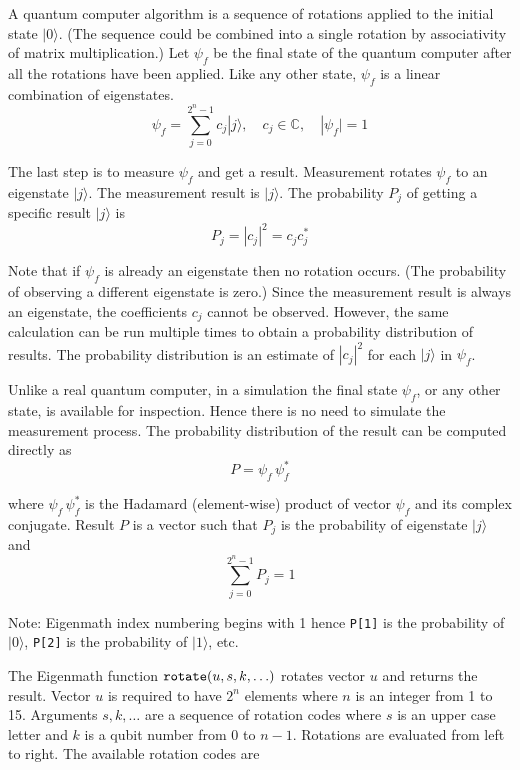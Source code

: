 \documentclass[12pt]{article}
\begin{document}
A quantum computer algorithm is a sequence of rotations
applied to the initial state $|0\rangle$.
(The sequence could be combined into a single rotation
by associativity of matrix multiplication.)
Let $\psi_f$ be the final state of the quantum computer
after all the rotations have been applied.
Like any other state, $\psi_f$ is a linear combination of eigenstates.
\begin{equation*}
\psi_f=\sum_{j=0}^{2^n-1}c_j|j\rangle,
\quad
c_j\in\mathbb C,
\quad
|\psi_f|=1
\end{equation*}

The last step is to measure $\psi_f$ and get a result.
Measurement rotates $\psi_f$ to an eigenstate $|j\rangle$.
The measurement result is $|j\rangle$.
The probability $P_j$ of getting a specific result $|j\rangle$ is
\begin{equation*}
P_j=|c_j|^2=c_jc_j^*
\end{equation*}

Note that if $\psi_f$ is already an eigenstate then no rotation occurs.
(The probability of observing a different eigenstate is zero.)
Since the measurement result is always an eigenstate,
the coefficients $c_j$ cannot be observed.
However, the same calculation can be run multiple times
to obtain a probability distribution of results.
The probability distribution is an estimate
of $|c_j|^2$ for each $|j\rangle$ in $\psi_f$.

\bigskip
Unlike a real quantum computer, in a simulation
the final state $\psi_f$, or any other state, is available for inspection.
Hence there is no need to simulate the measurement process.
The probability distribution of the result can be computed directly as
\begin{equation*}
P=\psi_f\,\psi_f^*
\end{equation*}

where $\psi_f\,\psi_f^*$
is the Hadamard (element-wise) product of vector $\psi_f$ and its complex conjugate.
Result $P$ is a vector such that $P_j$ is the
probability of eigenstate $|j\rangle$ and
\begin{equation*}
\sum_{j=0}^{2^n-1} P_j=1
\end{equation*}

Note: Eigenmath index numbering begins with 1 hence
\verb$P[1]$ is the probability of $|0\rangle$,
\verb$P[2]$ is the probability of $|1\rangle$, etc.

\bigskip
The Eigenmath function
$\text{\tt rotate}(u,s,k,\ldots)$
rotates vector $u$ and returns the result.
Vector $u$ is required to have $2^n$ elements where $n$ is an
integer from 1 to 15.
Arguments $s,k,\ldots$ are a sequence of rotation codes
where $s$ is an upper case letter and $k$ is a qubit number
from 0 to $n-1$.
Rotations are evaluated from left to right.
The available rotation codes are
\end{document}
